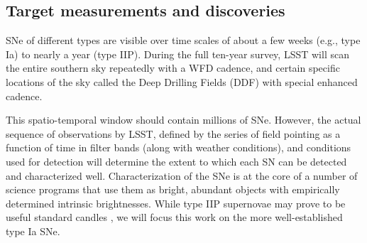 
\subsection{Target measurements and discoveries}
\label{sec:\secname:targets}

SNe of different types are visible over time scales of about a few
weeks (e.g., type Ia) to nearly a year (type IIP).  During the full
ten-year survey, LSST will scan the entire southern sky repeatedly with
a WFD cadence, and certain specific locations of the sky called the Deep
Drilling Fields (DDF) with special enhanced cadence.

This spatio-temporal window should contain millions
of SNe. However, the actual sequence of
observations by LSST, defined by the series of field pointing as a
function of time in filter bands (along with weather conditions), and
conditions used for detection will determine the extent to which each
SN can be detected and characterized well.  Characterization of the SNe
is at the core of a number of science
programs that use them as bright, abundant objects with empirically
determined intrinsic brightnesses. While type IIP supernovae may prove to be useful standard
candles \citep{Sanders2014}, we will focus this work on the more well-established type Ia SNe.

